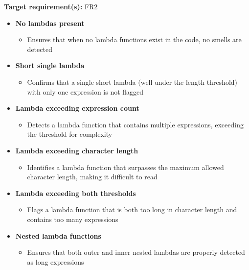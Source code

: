 \documentclass[12pt, titlepage]{article}
\begin{document}
  \noindent\textbf{Target requirement(s):} FR2 ~\cite{SRS} \\

  \begin{itemize}
    \item \textbf{No lambdas present}
        \begin{itemize}
        \item Ensures that when no lambda functions exist in the code, no smells are detected
        \end{itemize}

    \item \textbf{Short single lambda}
        \begin{itemize}
        \item Confirms that a single short lambda (well under the length threshold) with only one expression is not flagged
        \end{itemize}

    \item \textbf{Lambda exceeding expression count}
        \begin{itemize}
        \item Detects a lambda function that contains multiple expressions, exceeding the threshold for complexity
        \end{itemize}

    \item \textbf{Lambda exceeding character length}
        \begin{itemize}
        \item Identifies a lambda function that surpasses the maximum allowed character length, making it difficult to read
        \end{itemize}

    \item \textbf{Lambda exceeding both thresholds}
        \begin{itemize}
        \item Flags a lambda function that is both too long in character length and contains too many expressions
        \end{itemize}

    \item \textbf{Nested lambda functions}
        \begin{itemize}
        \item Ensures that both outer and inner nested lambdas are properly detected as long expressions
        \end{itemize}


\end{itemize}
\end{document}
